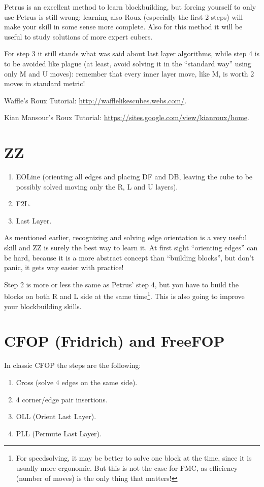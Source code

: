 \documentclass[11pt,a4paper]{book}
\begin{document}
Petrus is an excellent method to learn blockbuilding, but forcing yourself to only use Petrus is still wrong: learning also Roux (especially the first 2 steps) will make your skill in some sense more complete. Also for this method it will be useful to study solutions of more expert cubers.

For step 3 it still stands what was said about last layer algorithms, while step 4 is to be avoided like plague (at least, avoid solving it in the ``standard way'' using only M and U moves): remember that every inner layer move, like M, is worth 2 moves in standard metric!

Waffle's Roux Tutorial: \url{http://wafflelikescubes.webs.com/}.

Kian Mansour's Roux Tutorial: \url{https://sites.google.com/view/kianroux/home}.

\section{ZZ}
\begin{enumerate}
\item EOLine (orienting all edges and placing DF and DB, leaving the cube to be possibly solved moving only the R, L and U layers).
\item F2L.
\item Last Layer.
\end{enumerate}

As mentioned earlier, recognizing and solving edge orientation is a very useful skill and ZZ is surely the best way to learn it. At first sight ``orienting edges'' can be hard, because it is a more abstract concept than ``building blocks'', but don't panic, it gets way easier with practice!

Step 2 is more or less the same as Petrus' step 4, but you have to build the blocks on both R and L side at the same time\footnote{For speedsolving, it may be better to solve one block at the time, since it is usually more ergonomic. But this is not the case for FMC, as efficiency (number of moves) is the only thing that matters!}. This is also going to improve your blockbuilding skills.

\section{CFOP (Fridrich) and FreeFOP}
In classic CFOP the steps are the following:
\begin{enumerate}
\item Cross (solve 4 edges on the same side).
\item 4 corner/edge pair insertions.
\item OLL (Orient Last Layer).
\item PLL (Permute Last Layer).
\end{enumerate}
\end{document}
